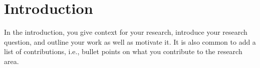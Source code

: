 \chapter{Introduction}\label{ch:introduction}
In the introduction, you give context for your research, introduce your research question, and outline your work as well as motivate it.
It is also common to add a list of contributions, i.e., bullet points on what you contribute to the research area.
